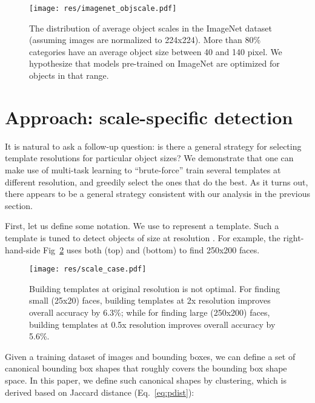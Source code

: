 \documentclass[10pt,twocolumn,letterpaper]{article}
\begin{document}
\begin{figure}
  \centering
  \texttt{[image: res/imagenet\_objscale.pdf]}
  \caption{The distribution of average object scales in the ImageNet dataset (assuming images are normalized to 224x224). More than 80\% categories have an average object size between 40 and 140 pixel. We hypothesize that models pre-trained on ImageNet are optimized for objects in that range.  }
  \label{fig:imagenet}
\end{figure}







\section{Approach: scale-specific detection}
\label{sec:approach}



It is natural to ask a follow-up question: is there a general strategy for selecting template resolutions for particular object sizes? We demonstrate that one can make use of multi-task learning to ``brute-force'' train several templates at different resolution, and greedily select the ones that do the best. As it turns out, there appears to be a general strategy consistent with our analysis in the previous section.

First, let us define some notation. We use  to represent a template. Such a template is tuned to detect objects of size  at resolution . For example, the right-hand-side Fig~\ref{fig:scale-case} uses both  (top) and  (bottom) to find 250x200 faces. 

\begin{figure}[t]
  \centering
  \texttt{[image: res/scale\_case.pdf]}
  \caption{Building templates at original resolution is not optimal. For finding small (25x20) faces, building templates at 2x resolution improves overall accuracy by 6.3\%; while for finding large (250x200) faces, building templates at 0.5x resolution improves overall accuracy by 5.6\%. }
  \label{fig:scale-case}
\end{figure}

Given a training dataset of images and bounding boxes, we can define a set of canonical bounding box shapes that roughly covers the bounding box shape space. In this paper, we define such canonical shapes by clustering, which is derived based on Jaccard distance (Eq.~\eqref{eq:pdist}):
\end{document}
